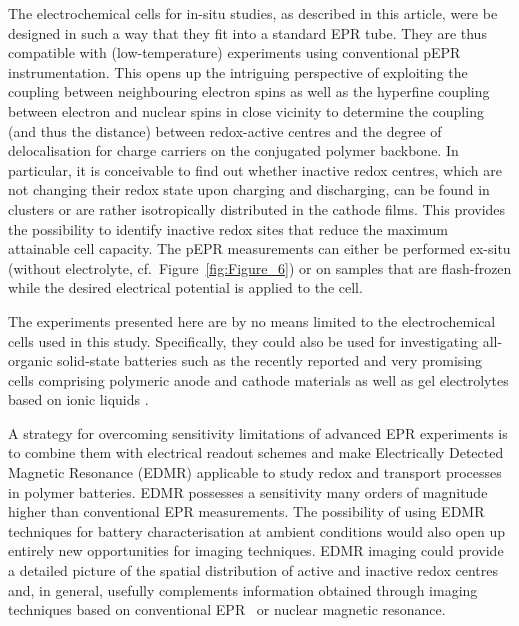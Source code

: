 \documentclass{WileyMSP-template}
\begin{document}
\bigbreak


The electrochemical cells for in-situ studies, as described in this article, were be designed in such a way that they fit into a standard EPR tube. They are thus compatible with (low-temperature) experiments using conventional pEPR instrumentation. This opens up the intriguing perspective of exploiting the coupling between neighbouring electron spins as well as the hyperfine coupling between electron and nuclear spins in close vicinity to determine the coupling (and thus the distance) between redox-active centres and the degree of delocalisation for charge carriers on the conjugated polymer backbone. In particular, it is conceivable to find out whether inactive redox centres, which are not changing their redox state upon charging and discharging, can be found in clusters or are rather isotropically distributed in the cathode films. This provides the possibility to identify inactive redox sites that reduce the maximum attainable cell capacity. The pEPR measurements can either be performed ex-situ (without electrolyte, cf.\ Figure~\ref{fig:Figure_6}) or on samples that are flash-frozen while the desired electrical potential is applied to the cell.\\

\bigbreak

The experiments presented here are by no means limited to the electrochemical cells used in this study. Specifically, they could also be used for investigating all-organic solid-state batteries such as the recently reported and very promising cells comprising polymeric anode and cathode materials as well as gel electrolytes based on ionic liquids \cite{muench2021_jps}.\\

\bigbreak

A strategy for overcoming sensitivity limitations of advanced EPR experiments is to combine them with electrical readout schemes and make Electrically Detected Magnetic Resonance (EDMR) applicable to study redox and transport processes in polymer batteries. EDMR possesses a sensitivity many orders of magnitude higher than conventional EPR measurements.\cite{mccamey2006_apl} The possibility of using EDMR techniques for battery characterisation at ambient conditions would also open up entirely new opportunities for imaging techniques. EDMR imaging could provide a detailed picture of the spatial distribution of active and inactive redox centres and, in general, usefully complements information obtained through imaging techniques based on conventional EPR~\cite{sathiya2015_natcomm} or nuclear magnetic resonance.\cite{ilott2016_pnas}
\end{document}
